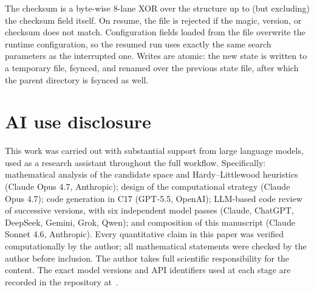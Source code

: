 \documentclass[11pt,a4paper]{article}
\theoremstyle{definition}
\begin{document}
The checksum is a byte-wise 8-lane XOR over the structure up to (but
excluding) the checksum field itself. On resume, the file is rejected
if the magic, version, or checksum does not match. Configuration fields
loaded from the file overwrite the runtime configuration, so the resumed
run uses exactly the same search parameters as the interrupted one.
Writes are atomic: the new state is written to a temporary file, fsynced,
and renamed over the previous state file, after which the parent
directory is fsynced as well.

\section*{AI use disclosure}

This work was carried out with substantial support from large language
models, used as a research assistant throughout the full workflow.
Specifically: mathematical analysis of the candidate space and
Hardy--Littlewood heuristics (Claude Opus 4.7, Anthropic); design of
the computational strategy (Claude Opus 4.7); code generation in C17
(GPT-5.5, OpenAI); LLM-based code review of successive versions, with
six independent model passes (Claude, ChatGPT, DeepSeek, Gemini, Grok,
Qwen); and composition of this manuscript (Claude Sonnet 4.6,
Anthropic). Every quantitative claim in this paper was verified
computationally by the author; all mathematical statements were checked
by the author before inclusion. The author takes full scientific
responsibility for the content. The exact model versions and API
identifiers used at each stage are recorded in the repository
at~\cite{repo}.
\end{document}
